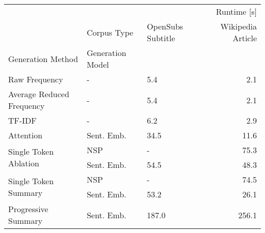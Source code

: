 \begin{tabular}{lllr}
\toprule
 &  & \multicolumn{2}{r}{Runtime [s]} \\
 & Corpus Type & OpenSubs Subtitle & Wikipedia Article \\
Generation Method & Generation Model &  &  \\
\midrule
Raw Frequency & - & 5.4 & 2.1 \\
\cline{1-4}
Average Reduced Frequency & - & 5.4 & 2.1 \\
\cline{1-4}
TF-IDF & - & 6.2 & 2.9 \\
\cline{1-4}
Attention & Sent. Emb. & 34.5 & 11.6 \\
\cline{1-4}
\multirow[t]{2}{*}{Single Token Ablation} & NSP & - & 75.3 \\
 & Sent. Emb. & 54.5 & 48.3 \\
\cline{1-4}
\multirow[t]{2}{*}{Single Token Summary} & NSP & - & 74.5 \\
 & Sent. Emb. & 53.2 & 26.1 \\
\cline{1-4}
Progressive Summary & Sent. Emb. & 187.0 & 256.1 \\
\cline{1-4}
\bottomrule
\end{tabular}
